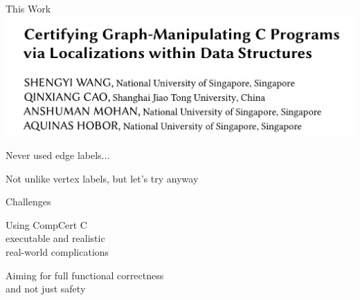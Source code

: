 \documentclass[usenames, xcolor=dvipsnames]{beamer}
\begin{document}
\begin{frame}{This Work}
\hspace{2em} \includegraphics[scale=0.2]{paper_screen}

\bigskip

Never used edge labels... 

\pause

Not unlike vertex labels, but let's try anyway

\pause
{}
\end{frame}

\begin{frame}{Challenges}

Using CompCert C 
\\ \hspace{1em} executable and realistic 
\\ \hspace{1em} \alert{real-world complications}

\bigskip

Aiming for \alert{full functional correctness}
\\ \hspace{1em} and not just safety 

\end{frame}
\end{document}
